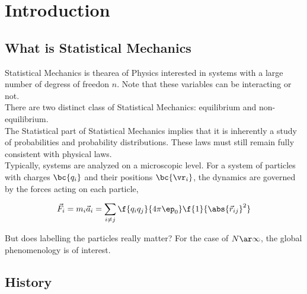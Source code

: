 \documentclass{article}
\begin{document}
\titlePage

\tableOfContents

\disclaimer

\section{Introduction}

\subsection{What is Statistical Mechanics}

Statistical Mechanics is thearea of Physics interested in systems with a large number of degress of freedon $n$. Note that these variables can be interacting or not. \\

There are two distinct class of Statistical Mechanics: equilibrium and non-equilibrium. \\

The Statistical part of Statistical Mechanics implies that it is inherently a study of probabilities and probability distributions. These laws must still remain fully consistent with physical laws. \\

Typically, systems are analyzed on a microscopic level. For a system of particles with charges $\bc{q_i}$ and their positions $\bc{\vr_i}$, the dynamics are governed by the forces acting on each particle,

\[ \vec{F}_i = m_i \vec{a}_i = \sum_{i\neq j} \f{q_iq_j}{4\pi\ep_0} \f{1}{\abs{\vec{r}_{ij}}^2} \]

But does labelling the particles really matter? For the case of $N \ar \infty$, the global phenomenology is of interest.

\subsection{History}
\end{document}
